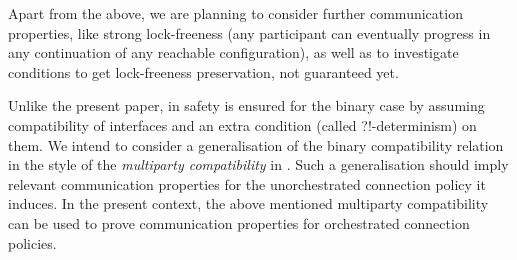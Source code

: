 \bfr Apart from the above, \efr we are planning to consider further communication properties, like strong lock-freeness
(any participant can eventually progress in any continuation of any reachable configuration),
as well as to investigate conditions to get lock-freeness preservation, not guaranteed yet. 


%
%

Unlike the present paper, in \cite{BdLH19} safety is ensured for the binary case by assuming 
compatibility of interfaces and an extra condition (called ?!-determinism) on them.
We  intend to consider 
a generalisation of the binary compatibility relation
 in the style of the {\em multiparty compatibility} in \cite{DY13}. 
Such a generalisation should imply relevant communication properties for the 
unorchestrated connection policy it induces.  In the present context, the above mentioned
multiparty compatibility can be used to prove communication properties for orchestrated connection policies. 



